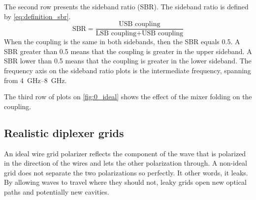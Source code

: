The second row presents the sideband ratio (SBR).
The sideband ratio is defined by \cref{eq:definition_sbr}.
\begin{equation}
    \text{SBR} =
    \frac{
        \text{USB coupling}
    }{
        \text{LSB coupling} + \text{USB coupling}
    }
    \label{eq:definition_sbr}
\end{equation}
When the coupling is the same in both sidebands, then the SBR equals 0.5.
A SBR greater than 0.5 means that the coupling is greater in the upper sideband.
A SBR lower than 0.5 means that the coupling is greater in the lower sideband.
The frequency axis on the sideband ratio plots is the intermediate frequency, spanning from \SIrange{4}{8}{\giga\hertz}.

The third row of plots on \cref{fig:0_ideal} shows the effect of the mixer folding on the coupling.


\clearpage
\subsection{Realistic diplexer grids}
An ideal wire grid polarizer reflects the component of the wave that is polarized in the direction of the wires and lets the other polarization through.
A non-ideal grid does not separate the two polarizations so perfectly.
It other words, it leaks.
By allowing waves to travel where they should not, leaky grids open new optical paths and potentially new cavities.

